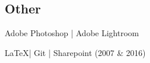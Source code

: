 \documentclass[]{deedy-resume-openfont}
\begin{document}
\begin{minipage}[t]{0.66\textwidth}
\subsection{Other}
\vspace{\topsep} %
\begin{tightemize}
\item Adobe Photoshop | Adobe Lightroom
\item \LaTeX | Git | Sharepoint (2007 \& 2016)
\end{tightemize}
\sectionsep







%
%

\end{minipage} 
\end{document}
